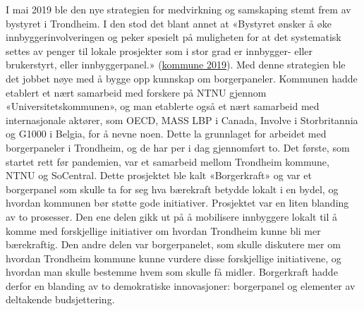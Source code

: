 \documentclass[
  12pt,
  a4paper, 12pt]{article}
\begin{document}
I mai 2019 ble den nye strategien for medvirkning og samskaping stemt frem av bystyret i Trondheim. I den stod det blant annet at «Bystyret ønsker å øke innbyggerinvolveringen og peker spesielt på muligheten for at det systematisk settes av penger til lokale prosjekter som i stor grad er innbygger- eller brukerstyrt, eller innbyggerpanel.» (\protect\hyperlink{ref-trondheim_kommune_den_2019}{kommune 2019}). Med denne strategien ble det jobbet nøye med å bygge opp kunnskap om borgerpaneler. Kommunen hadde etablert et nært samarbeid med forskere på NTNU gjennom «Universitetskommunen», og man etablerte også et nært samarbeid med internasjonale aktører, som OECD, MASS LBP i Canada, Involve i Storbritannia og G1000 i Belgia, for å nevne noen.
Dette la grunnlaget for arbeidet med borgerpaneler i Trondheim, og de har per i dag gjennomført to. Det første, som startet rett før pandemien, var et samarbeid mellom Trondheim kommune, NTNU og SoCentral. Dette prosjektet ble kalt «Borgerkraft» og var et borgerpanel som skulle ta for seg hva bærekraft betydde lokalt i en bydel, og hvordan kommunen bør støtte gode initiativer. Prosjektet var en liten blanding av to prosesser. Den ene delen gikk ut på å mobilisere innbyggere lokalt til å komme med forskjellige initiativer om hvordan Trondheim kunne bli mer bærekraftig. Den andre delen var borgerpanelet, som skulle diskutere mer om hvordan Trondheim kommune kunne vurdere disse forskjellige initiativene, og hvordan man skulle bestemme hvem som skulle få midler. Borgerkraft hadde derfor en blanding av to demokratiske innovasjoner: borgerpanel og elementer av deltakende budsjettering.
\end{document}
